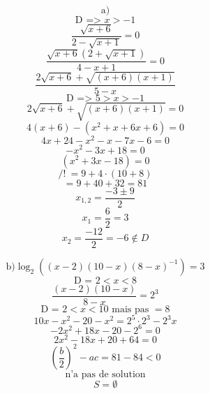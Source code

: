 \documentclass{article}
\begin{document}
\[ \text{a)} \]
\[ \text{D => } x \gt -1  \]
\[\frac{\sqrt{x+6}}{2-\sqrt{x+1}} = 0 \]
\[ \frac{\sqrt{x+6}(2+\sqrt{x+1})}{4-x+1} = 0 \]
\[ \frac{2\sqrt{x+6} + \sqrt{(x+6)(x+1)}}{5-x} \]
\[ \text{D => } 5 > x > -1 \]
\[ 2\sqrt{x+6} + \sqrt{(x+6)(x+1)} = 0 \]
\[ 4(x+6) - (x^2+x+6x+6) = 0 \]
\[ 4x+24 - x^2-x-7x-6 = 0 \]
\[ -x^2-3x+18 = 0 \]
\[ (x^2+3x-18) = 0 \]
\[ /!\ = 9+4 \cdot (10+8) \]
\[ = 9+40+32 = 81 \]
\[ x_{1,2} = \frac{-3 \pm 9}{2} \]
\[ x_1 = \frac{6}{2} = 3  \]
\[ x_2 = \frac{-12}{2} = -6 \notin D \]

\[ \text{b)} \log_2((x-2)(10-x)(8-x)^{-1}) = 3 \]
\[ \text{D = } 2 < x < 8  \]
\[ \frac{(x-2)(10-x)}{8-x} = 2^3  \]
\[ \text{D = } 2 < x < 10 \text{ mais pas } = 8 \]
\[ 10x-x^2-20-x^2 = 2^5 \cdot 2^3-2^3x \]
\[ -2x^2+18x-20-2^6 = 0 \]
\[ 2x^2-18x+20+64 = 0  \]
\[ (\frac{b}{2})^2-ac = 81-84 < 0 \]
\[ \text{n'a pas de solution} \]
\[ S = \emptyset \]
\end{document}
